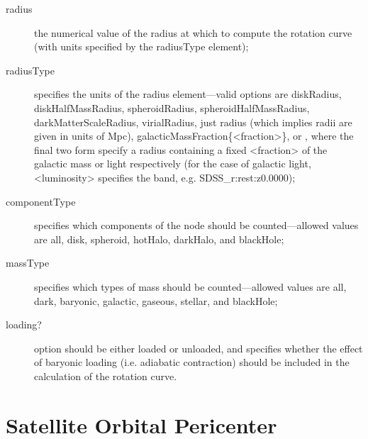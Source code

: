 \begin{description}
 \item [{\normalfont \ttfamily radius}] the numerical value of the radius at which to compute the rotation curve (with units specified by the {\normalfont \ttfamily radiusType} element);
 \item [{\normalfont \ttfamily radiusType}] specifies the units of the {\normalfont \ttfamily radius} element---valid options are {\normalfont \ttfamily diskRadius}, {\normalfont \ttfamily diskHalfMassRadius}, {\normalfont \ttfamily spheroidRadius}, {\normalfont \ttfamily spheroidHalfMassRadius}, {\normalfont \ttfamily darkMatterScaleRadius}, {\normalfont \ttfamily virialRadius}, just {\normalfont \ttfamily radius} (which implies radii are given in units of Mpc), {\normalfont \ttfamily galacticMassFraction\{\textless fraction\textgreater\}}, or , where the final two form specify a radius containing a fixed {\normalfont \ttfamily \textless fraction\textgreater} of the galactic mass or light respectively (for the case of galactic light, {\normalfont \ttfamily \textless luminosity\textgreater} specifies the band, e.g. {\normalfont \ttfamily SDSS\_r:rest:z0.0000});
 \item [{\normalfont \ttfamily componentType}] specifies which components of the node should be counted---allowed values are {\normalfont \ttfamily all}, {\normalfont \ttfamily disk}, {\normalfont \ttfamily spheroid}, {\normalfont \ttfamily hotHalo}, {\normalfont \ttfamily darkHalo}, and {\normalfont \ttfamily blackHole};
 \item [{\normalfont \ttfamily massType}] specifies which types of mass should be counted---allowed values are {\normalfont \ttfamily all}, {\normalfont \ttfamily dark}, {\normalfont \ttfamily baryonic}, {\normalfont \ttfamily galactic}, {\normalfont \ttfamily gaseous}, {\normalfont \ttfamily stellar}, and {\normalfont \ttfamily blackHole};
 \item [{\normalfont \ttfamily loading?}] option should be either {\normalfont \ttfamily loaded} or {\normalfont \ttfamily unloaded}, and specifies whether the effect of baryonic loading (i.e. adiabatic contraction) should be included in the calculation of the rotation curve.
\end{description}

\section{Satellite Orbital Pericenter}

